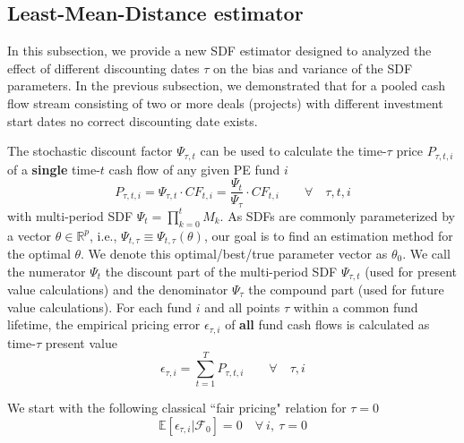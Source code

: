 \documentclass[12pt]{article}
\begin{document}
\subsection{Least-Mean-Distance estimator}
\label{sec:fundwise_lmd_estimator}

In this subsection, we provide a new SDF estimator designed to analyzed the effect of different discounting dates $\tau$ on the bias and variance of the SDF parameters.
In the previous subsection, we demonstrated that for a pooled cash flow stream consisting of two or more deals (projects) with different investment start dates no correct discounting date exists.


The stochastic discount factor $\Psi_{\tau,t}$ can be used to calculate the time-$\tau$ price $P_{\tau,t,i}$ of a \textbf{single} time-$t$ cash flow of any given PE fund $i$
\begin{equation}
\label{eq:price}
P_{\tau,t,i} = \Psi_{\tau,t} \cdot CF_{t,i}
= \frac{\Psi_{t}}{\Psi_{\tau}} \cdot CF_{t,i}
\qquad \forall \quad \tau,t,i
\end{equation}
with multi-period SDF $\Psi_t = \prod_{k=0}^t M_k$.
As SDFs are commonly parameterized by a vector $\theta \in \mathbb{R}^{p}$, i.e., $\Psi_{t,\tau} \equiv \Psi_{t,\tau} (\theta)$, our goal is to find an estimation method for the optimal $\theta$.
We denote this optimal/best/true parameter vector as $\theta_0$.
We call the numerator $\Psi_{t}$ the discount part of the multi-period SDF $\Psi_{\tau,t}$ (used for present value calculations) and the denominator $\Psi_{\tau}$ the compound part (used for future value calculations).
For each fund $i$ and all points $\tau$ within a common fund lifetime, the empirical pricing error $\epsilon_{\tau,i}$ of \textbf{all} fund cash flows is calculated as time-$\tau$ present value
\begin{equation}
\label{eq:pricing_error}
\epsilon_{\tau,i} = \sum_{t=1}^T P_{\tau,t,i} 
\qquad \forall \quad \tau,i
\end{equation}



\iffalse


We start with the following classical ``fair pricing" relation for $\tau = 0$
\begin{equation}
	\label{eq:basic_pricing_relation}
	\mathbb{E} \left[ 
	\epsilon_{\tau,i}
	\left| \mathcal{F}_{0} \right.
	\right] = 0
	\quad \forall \ i, \ \tau = 0
\end{equation}
\end{document}
